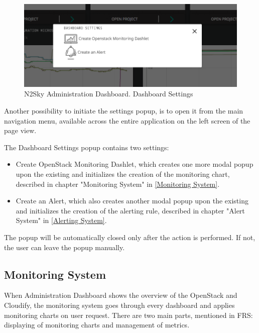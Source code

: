 \begin{figure}[htbp]
\begin{center}
  \includegraphics[width=\linewidth]{components/4/pics/dashboard_settings.png}
  \caption{N2Sky Administration Dashboard. Dashboard Settings}
  \label{fig:dashboard_settings}
\end{center}
\end{figure}

Another possibility to initiate the settings popup, is to open it from the main navigation menu, available across the entire application on the left screen of the page view. 

The Dashboard Settings popup contains two settings:
\begin{itemize}
\item Create OpenStack Monitoring Dashlet, which creates one more modal popup upon the existing and initializes the creation of the monitoring chart, described in chapter "Monitoring System" in \autoref{Monitoring System}.
\item Create an Alert, which also creates another modal popup upon the existing and initializes the creation of the alerting rule, described in chapter "Alert System" in \autoref{Alerting System}.
\end{itemize}

The popup will be automatically closed only after the action is performed. If not, the user can leave the popup manually.



\subsection{Monitoring System}\label{Monitoring System}

When Administration Dashboard shows the overview of the OpenStack and Cloudify, the monitoring system goes through every dashboard and applies monitoring charts on user request. There are two main parts, mentioned in FRS: displaying of monitoring charts and management of metrics.
 
